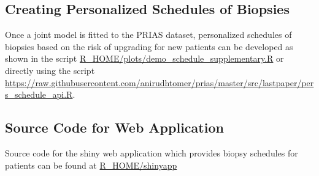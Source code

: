 \subsection{Creating Personalized Schedules of Biopsies}
Once a joint model is fitted to the PRIAS dataset, personalized schedules of biopsies based on the risk of upgrading for new patients can be developed as shown in the script \url{R_HOME/plots/demo_schedule_supplementary.R} or directly using the script \url{https://raw.githubusercontent.com/anirudhtomer/prias/master/src/lastpaper/pers_schedule_api.R}.

\subsection{Source Code for Web Application}
Source code for the shiny web application which provides biopsy schedules for patients can be found at \url{R_HOME/shinyapp}